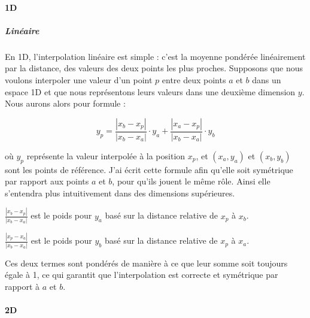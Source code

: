 
\paragraph{1D}
\subparagraph{Linéaire}

En 1D, l'interpolation linéaire est simple : c'est la moyenne pondérée linéairement par la distance, des valeurs des deux points les plus proches.
Supposons que nous voulons interpoler une valeur d'un point \( p \) entre deux points \( a \) et \( b \) dans un espace 1D
et que nous représentons leurs valeurs dans une deuxième dimension \( y \).
Nous aurons alors pour formule :

\[
y_p = \frac{|x_b - x_p|}{|x_b - x_a|} \cdot y_a + \frac{|x_a - x_p|}{|x_b - x_a|} \cdot y_b
\]

où \( y_p \) représente la valeur interpolée à la position \( x_p \), et \((x_a, y_a)\) et \((x_b, y_b)\) sont les points de référence. J'ai écrit cette formule afin qu'elle soit symétrique par rapport aux points \( a \) et \( b \), pour qu'ils jouent le même rôle. Ainsi elle s'entendra plus intuitivement dans des dimensions supérieures.
\vspace{0.5cm}

        \( \frac{|x_b - x_p|}{|x_b - x_a|} \) est le poids pour \( y_a \) basé sur la distance relative de \( x_p \) à \( x_b \).

        \( \frac{|x_p - x_a|}{|x_b - x_a|} \) est le poids pour \( y_b \) basé sur la distance relative de \( x_p \) à \( x_a \).\vspace{0.5cm}

Ces deux termes sont pondérés de manière à ce que leur somme soit toujours égale à 1, ce
qui garantit que l'interpolation est correcte et symétrique par rapport à \( a \) et \( b \).\vspace{0.5cm}


\paragraph{2D}

\vspace{0.5cm}

